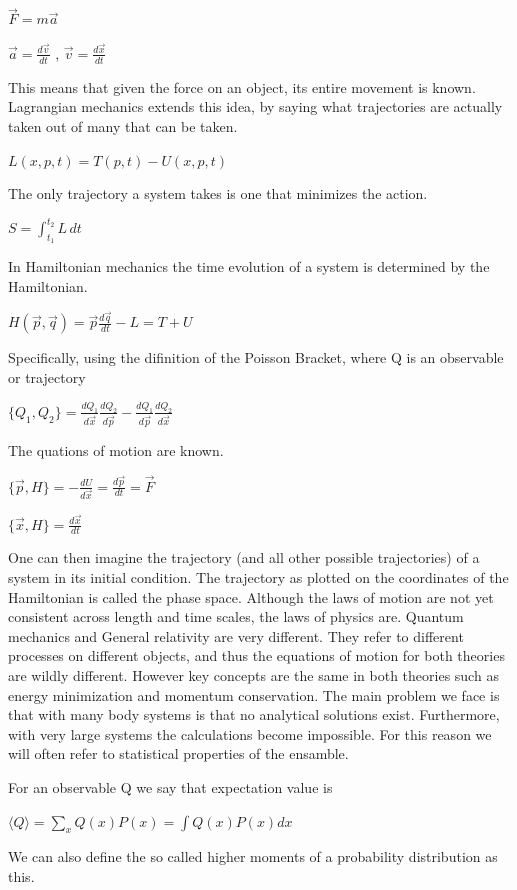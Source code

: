 \documentclass{article}
\begin{document}
$\vec{F} = m\vec{a}$

$\vec{a} = \frac{d\vec{v}}{dt}$ , $\vec{v} = \frac{d\vec{x}}{dt}$

This means that given the force on an object, its entire movement is known. Lagrangian mechanics extends this idea, by saying what trajectories are actually taken out of many that can be taken.

$L(x, p, t) = T(p, t) - U(x, p, t)$

The only trajectory a system takes is one that minimizes the action.

$S = \int_{t_1}^{t_2} L \, dt$

In Hamiltonian mechanics the time evolution of a system is determined by the Hamiltonian.

$H(\vec{p}, \vec{q}) = \vec{p} \frac{d\vec{q}}{dt} - L = T + U$

Specifically, using the difinition of the Poisson Bracket, where Q is an observable or trajectory

$\{Q_1, Q_2\} = \frac{dQ_1}{d\vec{x}} \frac{dQ_2}{d\vec{p}} - \frac{dQ_1}{d\vec{p}} \frac{dQ_2}{d\vec{x}}$

The quations of motion are known.

$\{\vec{p}, H\} = -\frac{dU}{d\vec{x}} = \frac{d\vec{p}}{dt} = \vec{F}$

$\{\vec{x}, H\} = \frac{d\vec{x}}{dt}$

One can then imagine the trajectory (and all other possible trajectories) of a system in its initial condition. The trajectory as plotted on the coordinates of the Hamiltonian is called the phase space. Although the laws of motion are not yet consistent across length and time scales, the laws of physics are. Quantum mechanics and General relativity are very different. They refer to different processes on different objects, and thus the equations of motion for both theories are wildly different. However key concepts are the same in both theories such as energy minimization and momentum conservation. The main problem we face is that with many body systems is that no analytical solutions exist. Furthermore, with very large systems the calculations become impossible. For this reason we will often refer to statistical properties of the ensamble.

For an observable Q we say that expectation value is

$\langle Q \rangle = \sum_x Q(x)P(x) = \int Q(x)P(x)dx$

We can also define the so called higher moments of a probability distribution as this.
\end{document}
